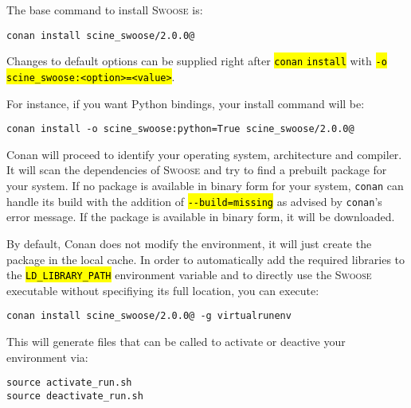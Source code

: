 \documentclass[]{tufte-book}
\begin{document}
The base command to install \textsc{Swoose} is:

\begin{mdframed}[backgroundcolor=LightSteelBlue!25, linewidth=0pt]
\begin{verbatim}
conan install scine_swoose/2.0.0@
\end{verbatim}
\end{mdframed}

Changes to default options can be supplied right after \hl{\:\texttt{conan} \texttt{install}\:} with \hl{\:\texttt{-o} \texttt{scine\_swoose:<option>=<value>}\:}.

For instance, if you want Python bindings, your install command will be:

\begin{mdframed}[backgroundcolor=LightSteelBlue!25, userdefinedwidth=12cm, linewidth=0pt]
\begin{verbatim}
conan install -o scine_swoose:python=True scine_swoose/2.0.0@
\end{verbatim}
\end{mdframed}

Conan will proceed to identify your operating system, architecture and compiler.
It will scan the dependencies of \textsc{Swoose} and try to find a prebuilt
package for your system. If no package is available in binary form for your
system, \texttt{conan} can handle its build with the addition of
\hl{\:\texttt{-{}-build=missing}\:} as advised by \texttt{conan}'s error message. If the package is
available in binary form, it will be downloaded.

By default, Conan does not modify the environment, it will just create the package in the local cache.
In order to automatically add the required libraries to the \hl{\:\texttt{LD\_LIBRARY\_PATH}\:} environment variable and to directly use the \textsc{Swoose} executable without specifiying its full location, you can execute:

\begin{mdframed}[backgroundcolor=LightSteelBlue!25, linewidth=0pt]
\begin{verbatim}
conan install scine_swoose/2.0.0@ -g virtualrunenv
\end{verbatim}
\end{mdframed}

This will generate files that can be called to activate or deactive your environment via:
\begin{mdframed}[backgroundcolor=LightSteelBlue!25, linewidth=0pt]
\begin{verbatim}
source activate_run.sh
source deactivate_run.sh
\end{verbatim}
\end{mdframed}
\end{document}

